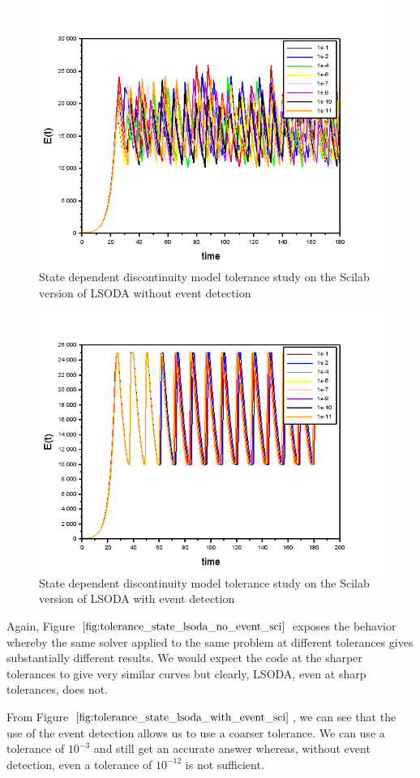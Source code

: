 \begin{figure}[h]
\centering
\includegraphics[width=0.7\linewidth]{./figures/tolerance_state_lsoda_no_event_sci}
\caption{State dependent discontinuity model tolerance study on the Scilab version of LSODA without event detection}
\label{fig:tolerance_state_lsoda_no_event_sci}
\end{figure}

\begin{figure}[h]
\centering
\includegraphics[width=0.7\linewidth]{./figures/tolerance_state_lsoda_with_event_sci}
\caption{State dependent discontinuity model tolerance study on the Scilab version of LSODA with event detection}
\label{fig:tolerance_state_lsoda_with_event_sci}
\end{figure}

Again, Figure $\ref{fig:tolerance_state_lsoda_no_event_sci}$ exposes the behavior whereby the same solver applied to the same problem at different tolerances gives substantially different results. We would expect the code at the sharper tolerances to give very similar curves but clearly, LSODA, even at sharp tolerances, does not.

From Figure $\ref{fig:tolerance_state_lsoda_with_event_sci}$, we can see that the use of the event detection allows us to use a coarser tolerance. We can use a tolerance of $10^{-3}$ and still get an accurate answer whereas, without event detection, even a tolerance of $10^{-12}$ is not sufficient.

